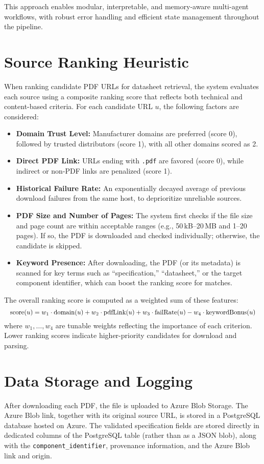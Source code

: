 This approach enables modular, interpretable, and memory-aware multi-agent workflows, with robust error handling and efficient state management throughout the pipeline.

\section{Source Ranking Heuristic}
When ranking candidate PDF URLs for datasheet retrieval, the system evaluates each source using a composite ranking score that reflects both technical and content-based criteria. For each candidate URL $u$, the following factors are considered:
\begin{itemize}
    \item \textbf{Domain Trust Level:} Manufacturer domains are preferred (score 0), followed by trusted distributors (score 1), with all other domains scored as 2.
    \item \textbf{Direct PDF Link:} URLs ending with \texttt{.pdf} are favored (score 0), while indirect or non-PDF links are penalized (score 1).
    \item \textbf{Historical Failure Rate:} An exponentially decayed average of previous download failures from the same host, to deprioritize unreliable sources.
    \item \textbf{PDF Size and Number of Pages:} The system first checks if the file size and page count are within acceptable ranges (e.g., 50\,kB--20\,MB and 1--20 pages). If so, the PDF is downloaded and checked individually; otherwise, the candidate is skipped.
    \item \textbf{Keyword Presence:} After downloading, the PDF (or its metadata) is scanned for key terms such as ``specification,'' ``datasheet,'' or the target component identifier, which can boost the ranking score for matches.
\end{itemize}
The overall ranking score is computed as a weighted sum of these features:
\begin{equation}
\label{eq:heuristic}
\resizebox{\linewidth}{!}{$
\mathrm{score}(u) = w_1 \cdot \mathrm{domain}(u) + w_2 \cdot \mathrm{pdfLink}(u) + w_3 \cdot \mathrm{failRate}(u) - w_4 \cdot \mathrm{keywordBonus}(u)
$}
\end{equation}
where $w_1, \ldots, w_4$ are tunable weights reflecting the importance of each criterion. Lower ranking scores indicate higher-priority candidates for download and parsing.

\section{Data Storage and Logging}
After downloading each PDF, the file is uploaded to Azure Blob Storage. The Azure Blob link, together with its original source URL, is stored in a PostgreSQL database hosted on Azure. The validated specification fields are stored directly in dedicated columns of the PostgreSQL table (rather than as a JSON blob), along with the \verb|component_identifier|, provenance information, and the Azure Blob link and origin.

